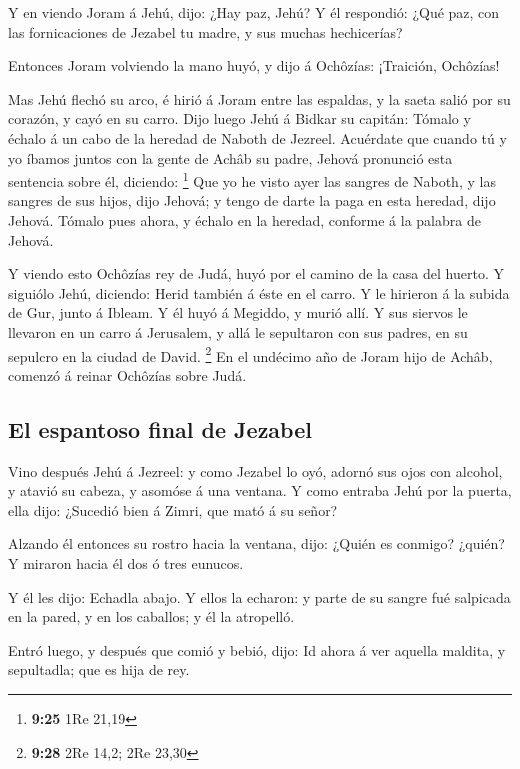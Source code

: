  Y en viendo Joram á Jehú, dijo: ¿Hay paz, Jehú? Y él
respondió: ¿Qué paz, con las fornicaciones de Jezabel tu madre, y sus
muchas hechicerías?

 Entonces Joram volviendo la mano huyó, y dijo á
Ochôzías: ¡Traición, Ochôzías!

 Mas Jehú flechó su arco, é hirió á Joram entre las
espaldas, y la saeta salió por su corazón, y cayó en su carro.
 Dijo luego Jehú á Bidkar su capitán: Tómalo y échalo á
un cabo de la heredad de Naboth de Jezreel. Acuérdate que cuando tú y yo
íbamos juntos con la gente de Achâb su padre, Jehová pronunció esta
sentencia sobre él, diciendo: \footnote{\textbf{9:25} 1Re 21,19}
 Que yo he visto ayer las sangres de Naboth, y las
sangres de sus hijos, dijo Jehová; y tengo de darte la paga en esta
heredad, dijo Jehová. Tómalo pues ahora, y échalo en la heredad,
conforme á la palabra de Jehová.

 Y viendo esto Ochôzías rey de Judá, huyó por el camino
de la casa del huerto. Y siguiólo Jehú, diciendo: Herid también á éste
en el carro. Y le hirieron á la subida de Gur, junto á Ibleam. Y él huyó
á Megiddo, y murió allí.  Y sus siervos le llevaron en un
carro á Jerusalem, y allá le sepultaron con sus padres, en su sepulcro
en la ciudad de David. \footnote{\textbf{9:28} 2Re 14,2; 2Re 23,30}
 En el undécimo año de Joram hijo de Achâb, comenzó á
reinar Ochôzías sobre Judá.

\hypertarget{el-espantoso-final-de-jezabel}{%
\subsection{El espantoso final de
Jezabel}\label{el-espantoso-final-de-jezabel}}

 Vino después Jehú á Jezreel: y como Jezabel lo oyó,
adornó sus ojos con alcohol, y atavió su cabeza, y asomóse á una
ventana.  Y como entraba Jehú por la puerta, ella dijo:
¿Sucedió bien á Zimri, que mató á su señor?

 Alzando él entonces su rostro hacia la ventana, dijo:
¿Quién es conmigo? ¿quién? Y miraron hacia él dos ó tres eunucos.

 Y él les dijo: Echadla abajo. Y ellos la echaron: y
parte de su sangre fué salpicada en la pared, y en los caballos; y él la
atropelló.

 Entró luego, y después que comió y bebió, dijo: Id ahora
á ver aquella maldita, y sepultadla; que es hija de rey.

